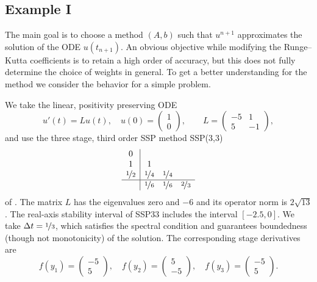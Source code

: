 \documentclass[a4paper]{article}
\numberwithin{equation}{section}
\theoremstyle{plain}
\theoremstyle{definition}
\numberwithin{theorem}{section}
\newcommand{\dt}{{\Delta t}}
\newcommand{\1}{\mathbbm{1}}
\begin{document}
\subsection{Example I}\label{sec:example_lin}

The main goal is to choose a method $(A,b)$ such that $u^{n+1}$
approximates the solution of the ODE $u(t_{n+1})$.
An obvious objective while modifying the Runge--Kutta coefficients
is to retain a high order of accuracy, but this does not fully
determine the choice of weights in general.
To get a better understanding for the method we consider the
behavior for a simple problem.

We take the linear, positivity preserving ODE
\cite{kopecz_unconditionally_2018}
\begin{equation}
  u'(t) = L u(t),
  \quad
  u(0) = \begin{pmatrix} 1 \\ 0 \end{pmatrix},
  \qquad
  L = \begin{pmatrix} -5 & 1 \\ 5 & -1\end{pmatrix},
\end{equation}
and use the three stage, third order SSP method SSP(3,3)
\begin{align}
\begin{array}{c|ccc}
0 &  &  & \\
1 & 1 &  & \\
\nicefrac{1}{2} & \nicefrac{1}{4} & \nicefrac{1}{4} & \\
\hline
 & \nicefrac{1}{6} & \nicefrac{1}{6} & \nicefrac{2}{3}\\
\end{array}
\end{align}
of \cite{shu1988efficient}.
The matrix $L$ has the eigenvalues zero and $-6$ and its operator
norm is $2 \sqrt{13}$.
The real-axis stability interval of SSP33 includes the interval $[-2.5,0]$.
We take $\dt = \nicefrac{1}{3}$, which satisfies the spectral
condition and guarantees boundedness (though not monotonicity)
of the solution.
The corresponding stage derivatives are
\begin{equation}
  f(y_1) = \begin{pmatrix} -5 \\ 5 \end{pmatrix},\quad
  f(y_2) = \begin{pmatrix} 5 \\ -5 \end{pmatrix},\quad
  f(y_3) = \begin{pmatrix} -5 \\ 5 \end{pmatrix}.
\end{equation}
\end{document}
